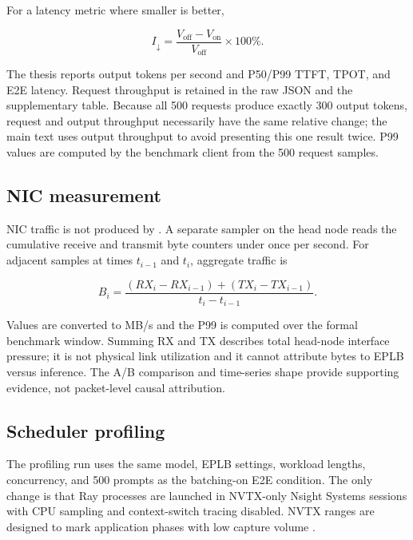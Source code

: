 For a latency metric where smaller is better,

\begin{equation}
  I_{\downarrow}=\frac{V_{\mathrm{off}}-V_{\mathrm{on}}}
  {V_{\mathrm{off}}}\times100\%.
\end{equation}

The thesis reports output tokens per second and P50/P99 TTFT, TPOT, and E2E
latency. Request throughput is retained in the raw JSON and the supplementary
table. Because all 500 requests produce exactly 300 output tokens, request and
output throughput necessarily have the same relative change; the main text
uses output throughput to avoid presenting this one result twice. P99 values
are computed by the benchmark client from the 500 request samples.

\subsection{NIC measurement}

NIC traffic is not produced by . A separate sampler on
the head node reads the cumulative receive and transmit byte counters under
 once per second. For adjacent samples at
times $t_{i-1}$ and $t_i$, aggregate traffic is

\begin{equation}
  B_i=\frac{(RX_i-RX_{i-1})+(TX_i-TX_{i-1})}
  {t_i-t_{i-1}}.
\end{equation}

Values are converted to MB/s and the P99 is computed over the formal benchmark
window. Summing RX and TX describes total head-node interface pressure; it is
not physical link utilization and it cannot attribute bytes to EPLB versus
inference. The A/B comparison and time-series shape provide supporting evidence,
not packet-level causal attribution.

\subsection{Scheduler profiling}

The profiling run uses the same model, EPLB settings, workload lengths,
concurrency, and 500 prompts as the batching-on E2E condition. The only change
is that Ray processes are launched in NVTX-only Nsight Systems sessions with
CPU sampling and context-switch tracing disabled. NVTX ranges are designed to
mark application phases with low capture volume \cite{nsightguide}.

